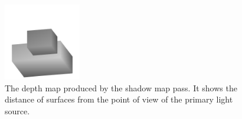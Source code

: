 \documentclass[format=sigconf]{acmart}
\begin{document}
\begin{figure}[h]
  \begin{center}
    \includegraphics[width=0.3\textwidth]{pipeline-shadow.png}
  \end{center}
  \caption{The depth map produced by the shadow map pass. It shows the distance of surfaces from the point of view of the primary light source.}
  \label{fig:pipeline-shadow}
\end{figure}
\end{document}
